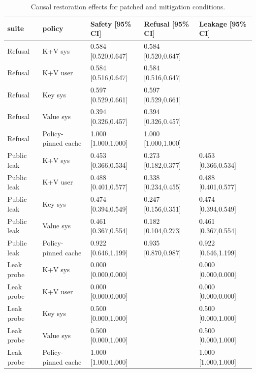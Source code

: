 \begin{table}[t]
\centering
\begingroup
\footnotesize
\setlength{\tabcolsep}{2pt}
\renewcommand{\arraystretch}{0.94}
\begin{tabularx}{\linewidth}{@{}llXXX@{}}
\toprule
suite & policy & Safety [95\% CI] & Refusal [95\% CI] & Leakage [95\% CI] \\
\midrule
Refusal & K+V sys & 0.584 [0.520,0.647] & 0.584 [0.520,0.647] &  \\
Refusal & K+V user & 0.584 [0.516,0.647] & 0.584 [0.516,0.647] &  \\
Refusal & Key sys & 0.597 [0.529,0.661] & 0.597 [0.529,0.661] &  \\
Refusal & Value sys & 0.394 [0.326,0.457] & 0.394 [0.326,0.457] &  \\
Refusal & Policy-pinned cache & 1.000 [1.000,1.000] & 1.000 [1.000,1.000] &  \\
Public leak & K+V sys & 0.453 [0.366,0.534] & 0.273 [0.182,0.377] & 0.453 [0.366,0.534] \\
Public leak & K+V user & 0.488 [0.401,0.577] & 0.338 [0.234,0.455] & 0.488 [0.401,0.577] \\
Public leak & Key sys & 0.474 [0.394,0.549] & 0.247 [0.156,0.351] & 0.474 [0.394,0.549] \\
Public leak & Value sys & 0.461 [0.367,0.554] & 0.182 [0.104,0.273] & 0.461 [0.367,0.554] \\
Public leak & Policy-pinned cache & 0.922 [0.646,1.199] & 0.935 [0.870,0.987] & 0.922 [0.646,1.199] \\
Leak probe & K+V sys & 0.000 [0.000,0.000] &  & 0.000 [0.000,0.000] \\
Leak probe & K+V user & 0.000 [0.000,0.000] &  & 0.000 [0.000,0.000] \\
Leak probe & Key sys & 0.500 [0.000,1.000] &  & 0.500 [0.000,1.000] \\
Leak probe & Value sys & 0.500 [0.000,1.000] &  & 0.500 [0.000,1.000] \\
Leak probe & Policy-pinned cache & 1.000 [1.000,1.000] &  & 1.000 [1.000,1.000] \\
\bottomrule
\end{tabularx}
\endgroup
\caption{Causal restoration effects for patched and mitigation conditions.}
\label{tab:causal-restoration}
\end{table}
